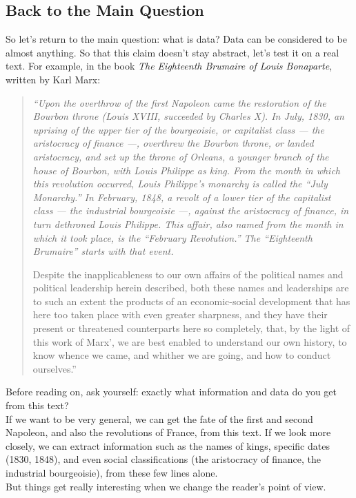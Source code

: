 \subsection{Back to the Main Question}
\label{sub:return-to-main-question}

So let's return to the main question: what is data? Data can be considered to be almost anything. So that this claim doesn't stay abstract, let's test it on a real text. For example, in the book \textit{The Eighteenth Brumaire of Louis Bonaparte}, written by Karl Marx:

\begin{quote}
\itshape
``Upon the overthrow of the first Napoleon came the restoration of the Bourbon throne (Louis XVIII, succeeded by Charles X). In July, 1830, an uprising of the upper tier of the bourgeoisie, or capitalist class --- the aristocracy of finance ---, overthrew the Bourbon throne, or landed aristocracy, and set up the throne of Orleans, a younger branch of the house of Bourbon, with Louis Philippe as king. From the month in which this revolution occurred, Louis Philippe's monarchy is called the ``July Monarchy.'' In February, 1848, a revolt of a lower tier of the capitalist class --- the industrial bourgeoisie ---, against the aristocracy of finance, in turn dethroned Louis Philippe. This affair, also named from the month in which it took place, is the ``February Revolution.'' The ``Eighteenth Brumaire'' starts with that event.

Despite the inapplicableness to our own affairs of the political names and political leadership herein described, both these names and leaderships are to such an extent the products of an economic-social development that has here too taken place with even greater sharpness, and they have their present or threatened counterparts here so completely, that, by the light of this work of Marx', we are best enabled to understand our own history, to know whence we came, and whither we are going, and how to conduct ourselves.''
\end{quote}
Before reading on, ask yourself: exactly what information and data do you get from this text?\\
If we want to be very general, we can get the fate of the first and second Napoleon, and also the revolutions of France, from this text. If we look more closely, we can extract information such as the names of kings, specific dates (1830, 1848), and even social classifications (the aristocracy of finance, the industrial bourgeoisie), from these few lines alone.\\
But things get really interesting when we change the reader's point of view.

